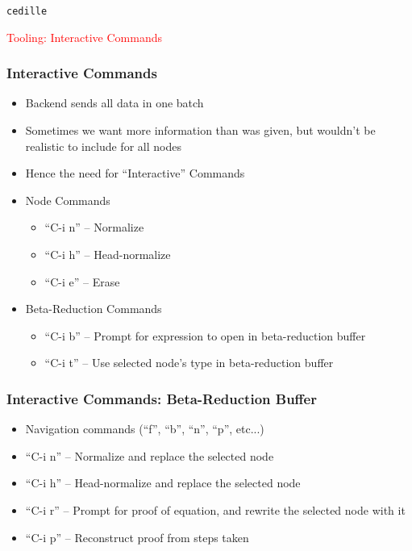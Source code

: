 \documentclass[11pt]{beamer}
\date{\ }
\begin{document}

\begin{frame}

\begin{center}

{\Huge \texttt{cedille}}

\vspace{1cm}

{\Large \textcolor{red}{Tooling: Interactive Commands}}

\end{center}

\end{frame}




\begin{frame}
\frametitle{Interactive Commands}
\begin{itemize}
\item Backend sends all data in one batch
\pause
\item Sometimes we want more information than was given, but wouldn't be realistic to include for all nodes
\pause
\item Hence the need for ``Interactive'' Commands
\pause
\item Node Commands
\pause
\begin{itemize}
\item ``C-i n'' -- Normalize
\pause
\item ``C-i h'' -- Head-normalize
\pause
\item ``C-i e'' -- Erase
\end{itemize}
\pause
\item Beta-Reduction Commands
\pause
\begin{itemize}
\item ``C-i b'' -- Prompt for expression to open in beta-reduction buffer
\pause
\item ``C-i t'' -- Use selected node's type in beta-reduction buffer
\pause
\end{itemize}

\end{itemize}

\end{frame}



\begin{frame}
\frametitle{Interactive Commands: Beta-Reduction Buffer}
\begin{itemize}
\item Navigation commands (``f'', ``b'', ``n'', ``p'', etc...)
\pause
\item ``C-i n'' -- Normalize and replace the selected node
\item ``C-i h'' -- Head-normalize and replace the selected node
\pause
\item ``C-i r'' -- Prompt for proof of equation, and rewrite the selected node with it
\pause
\item ``C-i p'' -- Reconstruct proof from steps taken
\pause
\end{itemize}

\end{frame}
\end{document}
